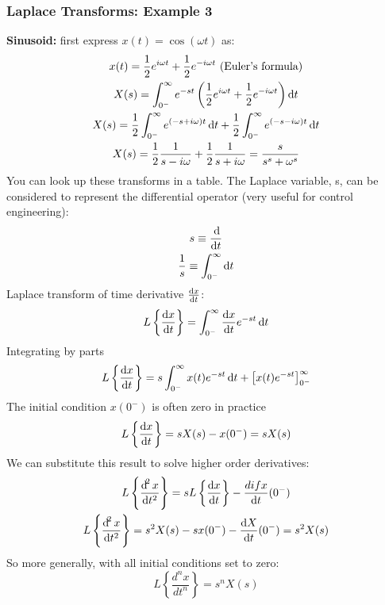 \documentclass[class=report, crop=false, 12pt,a4paper, tikz, border=4mm]{standalone}
\begin{document}
\subsubsection{Laplace Transforms: Example 3}
\textbf{Sinusoid:} first express $x(t) = \cos{(\omega t)}$ as:
\begin{gather}
  x(t) = \frac{1}{2} e^{i \omega t} + \frac{1}{2} e^{-i \omega t} \textrm{ (Euler's formula)}\\
  X(s) = \int_{0^-}^\infty e^{-st} \left( \frac{1}{2} e^{i \omega t} + \frac{1}{2} e^{-i \omega t} \right) \dif t\\
  X(s) = \frac{1}{2} \int_{0^-}^\infty e^{(-s + i \omega)t}\dif t + \frac{1}{2} \int_{0^-}^\infty e^{(-s - i \omega)t} \dif t\\
  X(s) = \frac{1}{2} \frac{1}{s - i \omega} + \frac{1}{2} \frac{1}{s + i \omega} = \frac{s}{s^s + \omega^s} 
\end{gather}
You can look up these transforms in a table. The Laplace variable, s, can be considered to represent the differential operator (very useful for control engineering):
\begin{gather}
  s \equiv \frac{\dif}{\dif t}\\
  \frac{1}{s} \equiv \int_{0^-}^\infty \dif t
\end{gather}
Laplace transform of time derivative $\frac{\dif x}{\dif t}$:
\begin{equation}
  L \left\{ \frac{\dif x}{\dif t} \right\} = \int_{0^-}^\infty \frac{\dif x}{\dif t} e^{-st} \dif t
\end{equation}
Integrating by parts
\begin{equation}
  L \left\{ \frac{\dif x}{\dif t} \right\} = s \int_{0^-}^\infty x(t) e^{-st} \dif t + \left[ x(t)e^{-st} \right]_{0^-}^\infty
\end{equation}
The initial condition $x(0^-)$ is often zero in practice
\begin{equation}
  L \left\{ \frac{\dif x}{\dif t} \right\} = sX(s) - x(0^-) = sX(s)
\end{equation}
We can substitute this result to solve higher order derivatives:
\begin{gather}
  L\left\{ \frac{\dif^2 x}{\dif t^2} \right\} = sL\left\{ \frac{\dif x}{\dif t} \right\} - \frac{dif x}{\dif t} (0^-)\\
  L\left\{ \frac{\dif^2 x}{\dif t^2} \right\} = s^2 X(s) - sx(0^-) - \frac{\dif X}{\dif t} (0^-) = s^2 X(s)
\end{gather}
So more generally, with all initial conditions set to zero:
\begin{equation}
  L\left\{ \frac{d^n x}{dt^n} \right\} = s^n X(s)
\end{equation}
\end{document}
